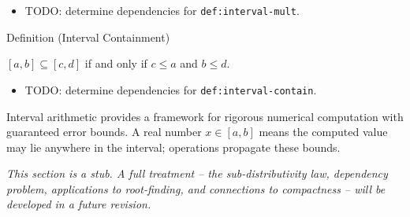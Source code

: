 \begin{dependencies}
\begin{itemize}
  \item TODO: determine dependencies for \texttt{def:interval-mult}.
\end{itemize}
\end{dependencies}

\begin{definitionbox}{Definition (Interval Containment)}
\begin{definition}\label{def:interval-contain}
$[a,b] \subseteq [c,d]$ if and only if $c \leq a$ and $b \leq d$.
\end{definition}
\end{definitionbox}

\begin{dependencies}
\begin{itemize}
  \item TODO: determine dependencies for \texttt{def:interval-contain}.
\end{itemize}
\end{dependencies}

\begin{remark*}[Motivation]
Interval arithmetic provides a framework for rigorous numerical computation
with guaranteed error bounds. A real number $x \in [a,b]$ means the computed
value may lie anywhere in the interval; operations propagate these bounds.
\end{remark*}

\begin{remark*}[Status]
\textit{This section is a stub. A full treatment -- the sub-distributivity law,
dependency problem, applications to root-finding, and connections to
compactness -- will be developed in a future revision.}
\end{remark*}
